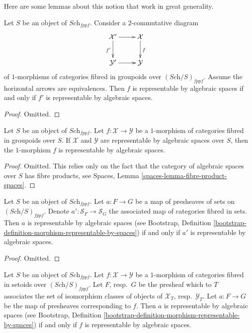 \noindent
Here are some lemmas about this notion that work in great generality.

\begin{lemma}
\label{lemma-representable-by-spaces-morphism-equivalent}
Let $S$ be an object of $\textit{Sch}_{fppf}$.
Consider a $2$-commutative diagram
$$
\xymatrix{
\mathcal{X}' \ar[r] \ar[d]_{f'} & \mathcal{X} \ar[d]^f \\
\mathcal{Y}' \ar[r] & \mathcal{Y}
}
$$
of $1$-morphisms of categories fibred in groupoids over
$(\textit{Sch}/S)_{fppf}$.
Assume the horizontal arrows are equivalences.
Then $f$ is representable by algebraic spaces
if and only if $f'$ is representable by algebraic spaces.
\end{lemma}

\begin{proof}
Omitted.
\end{proof}

\begin{lemma}
\label{lemma-morphism-spaces-gives-representable-by-spaces}
Let $S$ be an object of $\textit{Sch}_{fppf}$.
Let $f : \mathcal{X} \to \mathcal{Y}$
be a $1$-morphism of categories fibred in groupoids over $S$.
If $\mathcal{X}$ and $\mathcal{Y}$ are representable by
algebraic spaces over $S$, then the $1$-morphism $f$
is representable by algebraic spaces.
\end{lemma}

\begin{proof}
Omitted. This relies only on the fact that
the category of algebraic spaces over $S$ has fibre products,
see Spaces, Lemma \ref{spaces-lemma-fibre-product-spaces}.
\end{proof}

\begin{lemma}
\label{lemma-map-presheaves-representable-by-algebraic-spaces}
Let $S$ be an object of $\textit{Sch}_{fppf}$.
Let $a : F \to G$ be a map of presheaves of sets on $(\textit{Sch}/S)_{fppf}$.
Denote $a' : \mathcal{S}_F  \to \mathcal{S}_G$ the associated
map of categories fibred in sets.
Then $a$ is representable by algebraic spaces (see
Bootstrap,
Definition \ref{bootstrap-definition-morphism-representable-by-spaces})
if and only if $a'$ is representable by algebraic spaces.
\end{lemma}

\begin{proof}
Omitted.
\end{proof}

\begin{lemma}
\label{lemma-map-fibred-setoids-representable-algebraic-spaces}
Let $S$ be an object of $\textit{Sch}_{fppf}$.
Let $f : \mathcal{X} \to \mathcal{Y}$ be a $1$-morphism of
categories fibred in setoids over $(\textit{Sch}/S)_{fppf}$.
Let $F$, resp.\ $G$ be the presheaf which to $T$ associates
the set of isomorphism classes of objects of
$\mathcal{X}_T$, resp.\ $\mathcal{Y}_T$.
Let $a : F \to G$ be the map of presheaves corresponding to $f$.
Then $a$ is representable by algebraic spaces (see
Bootstrap,
Definition \ref{bootstrap-definition-morphism-representable-by-spaces})
if and only if $f$ is representable by algebraic spaces.
\end{lemma}

